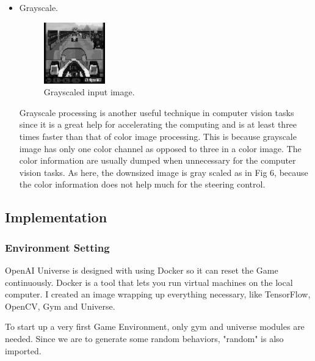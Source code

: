 \documentclass[a4paper]{article}
\begin{document}
\begin{itemize}
    \item Grayscale.

	\begin{figure}[h]
	\centering
	\includegraphics[width=0.25\textwidth]{coaster-racer-vision-grayscaled}
	\caption{Grayscaled input image.}
	\end{figure}
    
   Grayscale processing is another useful technique in computer vision tasks since it is a great help for accelerating the computing and is at least three times faster than that of color image processing. This is because grayscale image has only one color channel as opposed to three in a color image.  The color information are usually dumped when unnecessary for the computer vision tasks. As here, the downsized image is gray scaled as in Fig 6, because the color information does not help much for the steering control. 

\end{itemize}

\subsection{Implementation}

\subsubsection{Environment Setting}

OpenAI Universe is designed with using Docker so it can reset the Game continuously. Docker is a tool that lets you run virtual machines on the local computer. I created an image wrapping up everything necessary, like TensorFlow, OpenCV, Gym and Universe.

To start up a very first Game Environment, only gym and universe modules are needed. Since we are to generate some random behaviors, "random" is also imported.
\end{document}
